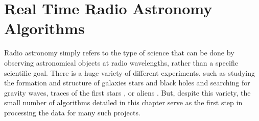 \chapter{Real Time Radio Astronomy Algorithms}
\label{chap:Real Time Radio Astronomy Algorithms}




Radio astronomy simply refers to the type of science that can be done by observing astronomical objects at radio wavelengths, rather than a specific scientific goal. 
There is a huge variety of different experiments, such as studying the formation and structure of galaxies stars and black holes and searching for gravity waves, traces of the first stars \cite{Parsons:2009vg}, or aliens \cite{1995ASPC...74..293W}.
But, despite this variety, the small number of algorithms detailed in this chapter serve as the first step in processing the data for many such projects.



